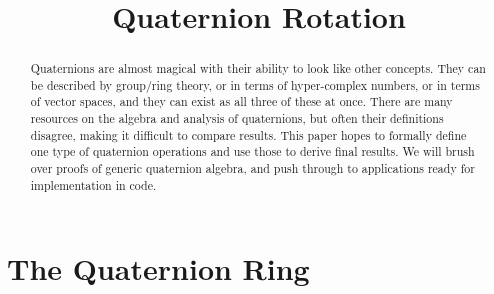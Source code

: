 \documentclass{amsart}
\theoremstyle{definition}
\theoremstyle{remark}
\numberwithin{equation}{section}
\begin{document}
\title{Quaternion Rotation}

\begin{abstract}
  Quaternions are almost magical with their ability to look like other concepts. They can be described by group/ring theory, or in terms of hyper-complex numbers, or in terms of vector spaces, and they can exist as all three of these at once. There are many resources on the algebra and analysis of quaternions, but often their definitions disagree, making it difficult to compare results. This paper hopes to formally define one type of quaternion operations and use those to derive final results. We will brush over proofs of generic quaternion algebra, and push through to applications ready for implementation in code.
\end{abstract}

\maketitle

\section{The Quaternion Ring}


\end{document}
